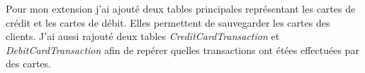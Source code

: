 Pour mon extension j'ai ajouté deux tables principales représentant les cartes
de crédit et les cartes de débit. Elles permettent de sauvegarder les cartes des clients.
J'ai aussi rajouté deux tables \emph{CreditCardTransaction} et \emph{DebitCardTransaction} afin de repérer
quelles transactions ont étées effectuées par des cartes.
